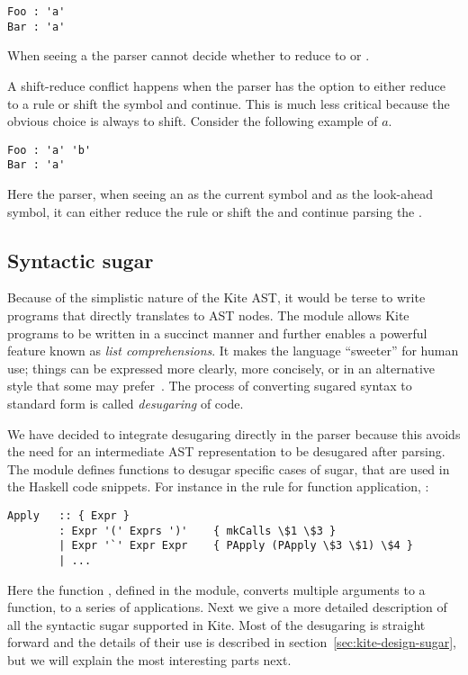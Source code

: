 \begin{lstlisting}
Foo : 'a'
Bar : 'a'
\end{lstlisting}

When seeing a  the parser cannot decide whether to reduce to  or .

A shift-reduce conflict happens when the parser has the option to either reduce to a rule or shift the symbol and continue. This is much less critical because the obvious choice is always to shift. Consider the following example of $a$.

\begin{lstlisting}
Foo : 'a' 'b'
Bar : 'a'
\end{lstlisting}

Here the parser, when seeing an  as the current symbol and  as the look-ahead symbol, it can either reduce the  rule or shift the  and continue parsing the .


\subsection{Syntactic sugar}
\label{sec:imp-sugar}
Because of the simplistic nature of the Kite AST, it would be terse to write programs that directly translates to AST nodes. The  module allows Kite programs to be written in a succinct manner and further enables a powerful feature known as \emph{list comprehensions}. It makes the language ``sweeter'' for human use; things can be expressed more clearly, more concisely, or in an alternative style that some may prefer~\cite{wiki-sugar14}. The process of converting sugared syntax to standard form is called \emph{desugaring} of code.

We have decided to integrate desugaring directly in the parser because this avoids the need for an intermediate AST representation to be desugared after parsing. The  module defines functions to desugar specific cases of sugar, that are used in the Haskell code snippets. For instance in the rule for function application, :

\begin{lstlisting}
Apply   :: { Expr }
        : Expr '(' Exprs ')'    { mkCalls \$1 \$3 }
        | Expr '`' Expr Expr    { PApply (PApply \$3 \$1) \$4 }
        | ...
\end{lstlisting}

Here the function , defined in the  module, converts multiple arguments to a function, to a series of applications. Next we give a more detailed description of all the syntactic sugar supported in Kite. Most of the desugaring is straight forward and the details of their use is described in section~\ref{sec:kite-design-sugar}, but we will explain the most interesting parts next.

